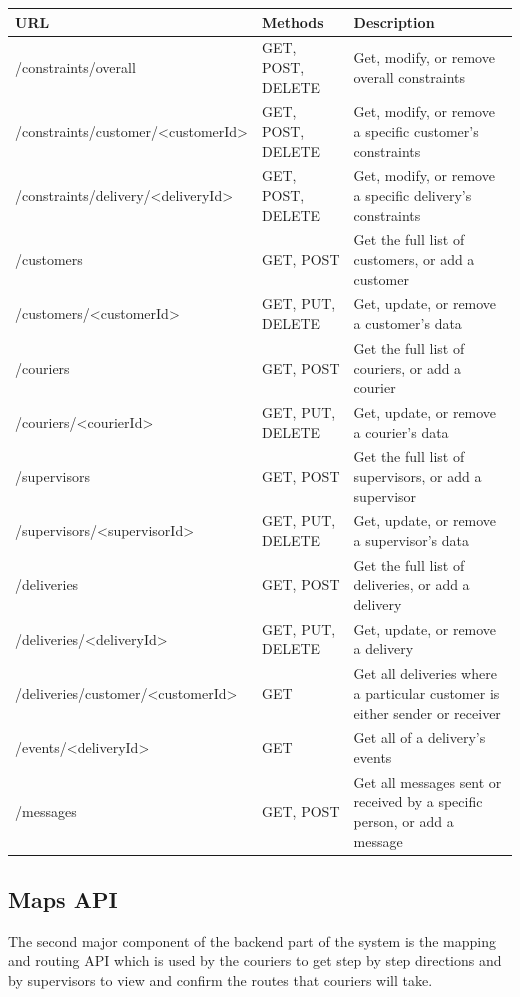 \begin{center}
\begin{tabular}{ | m{6.1cm} | m{3.8cm}| m{6cm} | } 
\hline
URL & Methods & Description \\
\hline
/constraints/overall & GET, POST, DELETE & Get, modify, or remove overall constraints \\
\hline
/constraints/customer/<customerId> & GET, POST, DELETE & Get, modify, or remove a specific customer's constraints \\
\hline
/constraints/delivery/<deliveryId> & GET, POST, DELETE & Get, modify, or remove a specific delivery's constraints\\
\hline
/customers & GET, POST & Get the full list of customers, or add a customer\\
\hline
/customers/<customerId> & GET, PUT, DELETE & Get, update, or remove a customer's data\\
\hline
/couriers & GET, POST & Get the full list of couriers, or add a courier\\
\hline
/couriers/<courierId> & GET, PUT, DELETE & Get, update, or remove a courier's data\\
\hline
/supervisors & GET, POST & Get the full list of supervisors, or add a supervisor\\
\hline
/supervisors/<supervisorId> & GET, PUT, DELETE & Get, update, or remove a supervisor's data\\
\hline
/deliveries & GET, POST & Get the full list of deliveries, or add a delivery\\
\hline
/deliveries/<deliveryId> & GET, PUT, DELETE & Get, update, or remove a delivery\\
\hline
/deliveries/customer/<customerId> & GET & Get all deliveries where a particular customer is either sender or receiver\\
\hline
/events/<deliveryId> & GET & Get all of a delivery's events\\
\hline
/messages & GET, POST & Get all messages sent or received by a specific person, or add a message\\
\hline
\end{tabular}
\end{center}

\subsection{Maps API} \label{mapsarch}

The second major component of the backend part of the system is the mapping and routing API which is used by the couriers to get step by step directions and by supervisors to view and confirm the routes that couriers will take.

